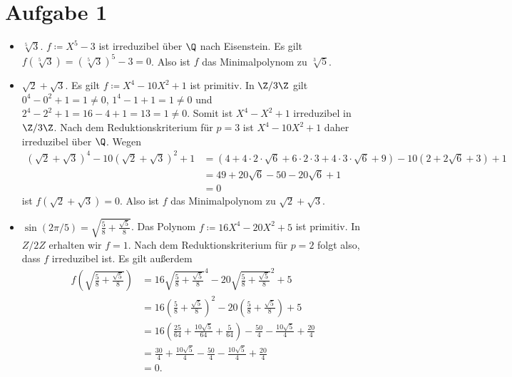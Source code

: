 \documentclass{article}
\begin{document}
\def\headheight{25pt}
    \section*{Aufgabe 1}
    \begin{itemize}
        \item $\sqrt[5]{3}$. $f \coloneqq X^5 - 3$ ist irreduzibel über $\Q$ nach Eisenstein. 
        Es gilt $f(\sqrt[5]{3}) = (\sqrt[5]{3})^5 - 3 = 0$. Also ist $f$ das Minimalpolynom zu $\sqrt[3]{5}$.
        \item $\sqrt{2} + \sqrt{3}$. Es gilt $f \coloneqq X^4 - 10X^2 + 1$ ist primitiv. 
        In $\Z/3\Z$ gilt $0^4 - 0^2 + 1 = 1 \neq 0$, $1^4 - 1 + 1 = 1 \neq 0$ und $2^4 - 2^2 + 1 = 16 - 4 + 1 = 13 = 1 \neq 0$. 
        Somit ist $X^4 - X^2 + 1$ irreduzibel in $\Z/3\Z$. 
        Nach dem Reduktionskriterium für $p = 3$ ist $X^4 - 10X^2 + 1$ daher irreduzibel über $\Q$.
        Wegen 
        \begin{align*}
            (\sqrt{2} + \sqrt{3})^4 - 10(\sqrt{2} + \sqrt{3})^2 + 1 
            &= (4 + 4 \cdot 2 \cdot \sqrt{6} + 6\cdot 2 \cdot 3 + 4 \cdot 3 \cdot \sqrt{6} + 9) - 10(2 + 2 \sqrt{6} + 3) +1\\
            &= 49 + 20 \sqrt{6} - 50 - 20 \sqrt{6} + 1\\
            &= 0
        \end{align*}
        ist $f(\sqrt{2} + \sqrt{3}) = 0$. Also ist $f$ das Minimalpolynom zu $\sqrt{2} + \sqrt{3}$.
        \item $\sin(2\pi /5) = \sqrt{\frac{5}{8} + \frac{\sqrt{5}}{8}}$. Das Polynom $f\coloneqq 16X^4 - 20X^2 + 5$ ist primitiv. In $Z/2Z$ erhalten wir $f = 1$. Nach dem Reduktionskriterium für $p = 2$ folgt also, dass $f$ irreduzibel ist.
        Es gilt außerdem
        \begin{align*}
            f\left( \sqrt{\frac{5}{8} + \frac{\sqrt{5}}{8}}\right) &= 16 \sqrt{\frac{5}{8} + \frac{\sqrt{5}}{8}}^4 - 20 \sqrt{\frac{5}{8} + \frac{\sqrt{5}}{8}}^2 + 5\\
            &= 16 \left(\frac{5}{8} + \frac{\sqrt{5}}{8}\right)^2 - 20 \left(\frac{5}{8} + \frac{\sqrt{5}}{8}\right) + 5\\
            &= 16 \left(\frac{25}{64} + \frac{10 \sqrt{5}}{64} + \frac{5}{64}\right) - \frac{50}{4} - \frac{10\sqrt{5}}{4} + \frac{20}{4}\\
            &= \frac{30}{4} + \frac{10\sqrt{5}}{4} - \frac{50}{4} - \frac{10\sqrt{5}}{4} + \frac{20}{4}\\
            &= 0.

\end{align*}
\end{itemize}
\end{document}
